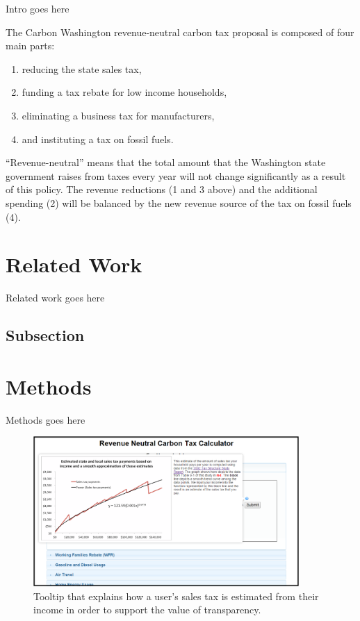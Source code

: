 \documentclass{sigchi}
\begin{document}
Intro goes here

The Carbon Washington revenue-neutral carbon tax proposal is composed of four main parts: 
\begin{enumerate}
\item reducing the state sales tax,
\item funding a tax rebate for low income households,
\item eliminating a business tax for manufacturers,
\item and instituting a tax on fossil fuels.
\end{enumerate}
``Revenue-neutral'' means that the total amount that the Washington state government raises 
from taxes every year will not change significantly as a result of this policy. The revenue 
reductions (1 and 3 above) and the additional spending (2) will be balanced by the new 
revenue source of the tax on fossil fuels (4).  

\section{Related Work}
Related work goes here

\subsection{Subsection}



\section{Methods}
Methods goes here
\begin{figure}[t]
\centering
\includegraphics[width=0.9\textwidth]{toolTipDemo}
\caption{Tooltip that explains how a user's sales tax is estimated from their income in order to support the value of transparency.}
\label{fig:tooltip}
\end{figure}
\end{document}
